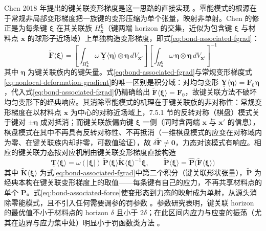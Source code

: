 Chen 2018 年提出的键关联变形梯度是这一思路的直接实现 \cite{Chen2018}。零能模式的根源在于常规非局部变形梯度把一族键的变形压缩为单个张量，映射非单射。Chen 的修正是为每条键 $\boldsymbol{\xi}$ 在其关联族 $H_{\mathbf{x}}^{\boldsymbol{\xi}}$（键两端 horizon 的交集，近似为包含键 $\boldsymbol{\xi}$ 与材料点 $\mathbf{x}$ 的球形子近场域）上单独构造变形梯度，即式\eqref{eq:bond-associated-fgrad}：
\begin{equation}
  \tilde{\mathbf{F}}\langle\boldsymbol{\xi}\rangle
  =\left[\int_{H_{\mathbf{x}}^{\boldsymbol{\xi}}}\omega\,
    \underline{\mathbf{Y}}\langle\boldsymbol{\eta}\rangle\otimes\boldsymbol{\eta}\,dV_{\mathbf{x}'}\right]
  \left[\int_{H_{\mathbf{x}}^{\boldsymbol{\xi}}}\omega\,
    \boldsymbol{\eta}\otimes\boldsymbol{\eta}\,dV_{\mathbf{x}'}\right]^{-1}
  \label{eq:bond-associated-fgrad}
\end{equation}
其中 $\boldsymbol{\eta}$ 为键关联族内的键矢量。式\eqref{eq:bond-associated-fgrad}与常规变形梯度式\eqref{eq:nonlocal-deformation-gradient}的唯一区别是积分域：对均匀变形 $\underline{\mathbf{Y}}\langle\boldsymbol{\eta}\rangle=\mathbf{F}_{0}\boldsymbol{\eta}$，代入式\eqref{eq:bond-associated-fgrad}仍精确给出 $\tilde{\mathbf{F}}\langle\boldsymbol{\xi}\rangle=\mathbf{F}_{0}$，故键关联方法不破坏均匀变形下的经典响应。其消除零能模式的机理在于键关联族的非对称性：常规变形梯度在以材料点 $\mathbf{x}$ 为中心的对称近场域上，7.5.1 节的反转对称（棋盘）模式关于键对 $\pm\boldsymbol{\eta}$ 成对抵消；而键关联族偏向键 $\boldsymbol{\xi}$ 一侧（同时含两端 $\mathbf{x}$ 与 $\mathbf{x}'$ 的信息），棋盘模式在其中不再具有反转对称性、不再抵消（一维棋盘模式的应变在对称域内为零、在键关联族内却非零，可数值验证），故 $\delta\tilde{\mathbf{F}}\neq\mathbf{0}$，力态对该模式有响应。相应的键关联力态按对应机制由键关联变形梯度直接构造
\begin{equation}
  \underline{\mathbf{T}}\langle\boldsymbol{\xi}\rangle
  =\omega(|\boldsymbol{\xi}|)\,\tilde{\mathbf{P}}\langle\boldsymbol{\xi}\rangle
  \tilde{\mathbf{K}}\langle\boldsymbol{\xi}\rangle^{-1}\boldsymbol{\xi},
  \qquad
  \tilde{\mathbf{P}}\langle\boldsymbol{\xi}\rangle=\hat{\mathbf{P}}\bigl(\tilde{\mathbf{F}}\langle\boldsymbol{\xi}\rangle\bigr)
  \label{eq:bond-associated-force}
\end{equation}
其中 $\tilde{\mathbf{K}}\langle\boldsymbol{\xi}\rangle$ 为式\eqref{eq:bond-associated-fgrad}中第二个积分（键关联形状张量），$\tilde{\mathbf{P}}$ 为经典本构在键关联变形梯度上的取值——每条键有自己的应力，不再共享材料点的单个 $\mathbf{P}$。式\eqref{eq:bond-associated-force}使变形态到力态的映射成为单射，从源头消除零能模式，且不引入任何需要调参的罚参数 \cite{Chen2018}。参数研究表明，键关联 horizon 的最优值不小于材料点的 horizon $\delta$ 且小于 $2\delta$；在此区间内应力与应变的振荡（尤其在边界与应力集中处）明显小于罚函数类方法 \cite{Chen2018}。

